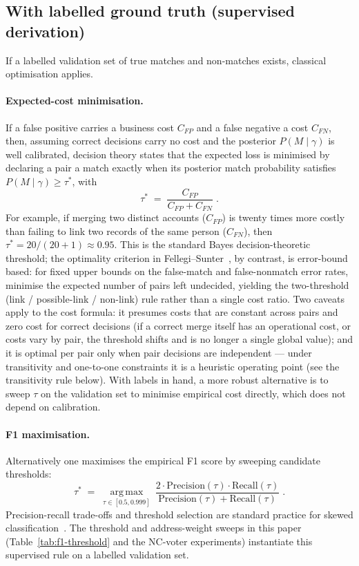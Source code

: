 \documentclass[11pt]{article}
\begin{document}
\subsection{With labelled ground truth (supervised derivation)}
If a labelled validation set of true matches and non-matches exists, classical optimisation applies.

\paragraph{Expected-cost minimisation.} If a false positive carries a business cost $C_{FP}$ and a false negative a cost $C_{FN}$, then, assuming correct decisions carry no cost and the posterior $P(M\mid\gamma)$ is well calibrated, decision theory states that the expected loss is minimised by declaring a pair a match exactly when its posterior match probability satisfies $P(M\mid \gamma)\ge \tau^*$, with
\[
\tau^* \;=\; \frac{C_{FP}}{C_{FP}+C_{FN}}\;.
\]
For example, if merging two distinct accounts ($C_{FP}$) is twenty times more costly than failing to link two records of the same person ($C_{FN}$), then $\tau^* = 20/(20+1) \approx 0.95$. This is the standard Bayes decision-theoretic threshold; the optimality criterion in Fellegi--Sunter~\cite{fellegi1969,winkler1993}, by contrast, is error-bound based: for fixed upper bounds on the false-match and false-nonmatch error rates, minimise the expected number of pairs left undecided, yielding the two-threshold (link / possible-link / non-link) rule rather than a single cost ratio. Two caveats apply to the cost formula: it presumes costs that are constant across pairs and zero cost for correct decisions (if a correct merge itself has an operational cost, or costs vary by pair, the threshold shifts and is no longer a single global value); and it is optimal per pair only when pair decisions are independent --- under transitivity and one-to-one constraints it is a heuristic operating point (see the transitivity rule below). With labels in hand, a more robust alternative is to sweep $\tau$ on the validation set to minimise empirical cost directly, which does not depend on calibration.

\paragraph{F1 maximisation.} Alternatively one maximises the empirical F1 score by sweeping candidate thresholds:
\[
\tau^* \;=\; \operatorname*{arg\,max}_{\tau\in[0.5,0.999]}\ \frac{2\cdot \mathrm{Precision}(\tau)\cdot \mathrm{Recall}(\tau)}
{\mathrm{Precision}(\tau)+\mathrm{Recall}(\tau)}\;.
\]
Precision-recall trade-offs and threshold selection are standard practice for skewed classification~\cite{davis2006,christen2012}. The threshold and address-weight sweeps in this paper (Table~\ref{tab:f1-threshold} and the NC-voter experiments) instantiate this supervised rule on a labelled validation set.
\end{document}
